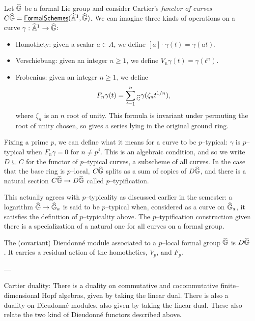 Let $\widehat{\mathbb G}$ be a formal Lie group and consider Cartier's \textit{functor of curves} $C\widehat{\mathbb G} = \operatorname{\underline{\smash{\mathsf{FormalSchemes}}}}(\widehat{\mathbb{A}}^1, \widehat{\mathbb G})$.  We can imagine three kinds of operations on a curve $\gamma: \widehat{\mathbb{A}}^1 \to \widehat{\mathbb G}$:
\begin{itemize}
\item Homothety: given a scalar $a \in A$, we define $[a] \cdot \gamma(t) = \gamma(at)$.
\item Verschiebung: given an integer $n \ge 1$, we define $V_n \gamma(t) = \gamma(t^n)$.
\item Frobenius: given an integer $n \ge 1$, we define \[F_n \gamma(t) = \sum_{i=1}^n{}_{\widehat{\mathbb G}} \gamma(\zeta_n t^{1/n}),\] where $\zeta_{n}$ is an $n${\th} root of unity.  This formula is invariant under permuting the root of unity chosen, so gives a series lying in the original ground ring.
\end{itemize}

Fixing a prime $p$, we can define what it means for a curve to be $p$--typical: $\gamma$ is $p$--typical when $F_n \gamma = 0$ for $n \ne p^j$.  This is an algebraic condition, and so we write $D \subseteq C$ for the functor of $p$--typical curves, a subscheme of all curves.  In the case that the base ring is $p$--local, $C\widehat{\mathbb G}$ splits as a sum of copies of $D\widehat{\mathbb G}$, and there is a natural section $C\widehat{\mathbb G} \to D\widehat{\mathbb G}$ called $p$--typification.

\begin{remark}
This actually agrees with $p$--typicality as discussed earlier in the semester: a logarithm $\widehat{\mathbb G} \to \widehat{\mathbb G}_a$ is said to be $p$--typical when, considered as a curve on $\widehat{\mathbb G}_a$, it satisfies the definition of $p$--typicality above.  The $p$--typification construction given there is a specialization of a natural one for all curves on a formal group.
\end{remark}

The (covariant) Dieudonn\'e module associated to a $p$--local formal group $\widehat{\mathbb G}$ is $D\widehat{\mathbb G}$.  It carries a residual action of the homotheties, $V_p$, and $F_p$.


---

Cartier duality: There is a duality on commutative and cocommutative finite--dimensional Hopf algebras, given by taking the linear dual.  There is also a duality on Dieudonn\'e modules, also given by taking the linear dual.  These also relate the two kind of Dieudonn\'e functors described above.

